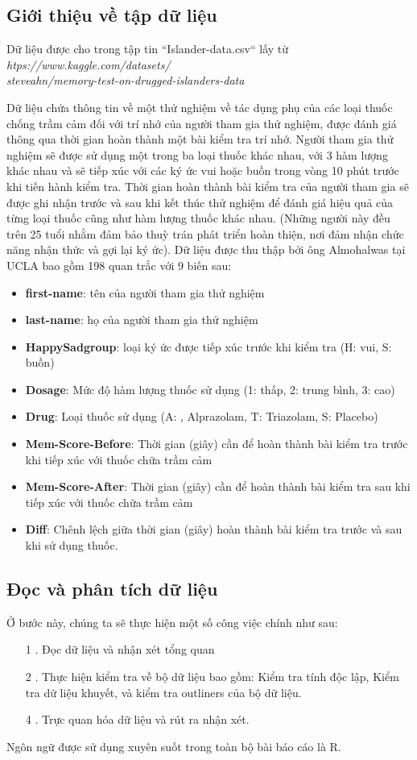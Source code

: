 \subsection{Giới thiệu về tập dữ liệu}
Dữ liệu được cho trong tập tin ``Islander-data.csv`` lấy từ \textit{htps://www.kaggle.com/datasets/\\steveahn/memory-test-on-drugged-islanders-data}

Dữ liệu chứa thông tin về một thử nghiệm về tác dụng phụ của các loại thuốc chống trầm cảm đối với trí nhớ của người tham gia thử nghiệm, được đánh giá thông qua thời gian hoàn thành một bài kiểm tra trí nhớ. Người tham gia thử nghiệm sẽ được sử dụng một trong ba loại thuốc khác nhau, với 3 hàm lượng khác nhau và sẽ tiếp xúc với các ký ức vui hoặc buồn trong vòng 10 phút trước khi tiến hành kiểm tra. Thời gian hoàn thành bài kiểm tra của người tham gia sẽ được ghi nhận trước và sau khi kết thúc thử nghiệm để đánh giá hiệu quả của từng loại thuốc cũng như hàm lượng thuốc khác nhau. (Những người này đều trên 25 tuổi nhằm đảm bảo thuỳ trán phát triển hoàn thiện, nơi đảm nhận chức năng nhận thức và gợi lại ký ức). Dữ liệu được thu thập bởi ông Almohalwas tại UCLA bao gồm 198 quan trắc với 9 biến sau:
\begin{itemize}
    \item \textbf{first-name}: tên của người tham gia thử nghiệm
    \item \textbf{last-name}: họ của người tham gia thử nghiệm
    \item \textbf{HappySadgroup}: loại ký ức được tiếp xúc trước khi kiểm tra (H: vui, S: buồn)
    \item \textbf{Dosage}: Mức độ hàm lượng thuốc sử dụng (1: thấp, 2: trung bình, 3: cao)
    \item \textbf{Drug}: Loại thuốc sử dụng (A: , Alprazolam, T: Triazolam, S: Placebo)
    \item \textbf{Mem-Score-Before}: Thời gian (giây) cần để hoàn thành bài kiểm tra trước khi tiếp xúc với thuốc chữa trầm cảm
    \item \textbf{Mem-Score-After}: Thời gian (giây) cần để hoàn thành bài kiểm tra sau khi tiếp xúc với thuốc chữa trầm cảm
    \item \textbf{Diff}: Chênh lệch giữa thời gian (giây) hoàn thành bài kiểm tra trước và sau khi sử dụng thuốc.
\end{itemize}

\subsection{Đọc và phân tích dữ liệu}
Ở bước này, chúng ta sẽ thực hiện một số công việc chính như sau:
\begin{itemize}
    \item [1]. Đọc dữ liệu và nhận xét tổng quan
    \item [2]. Thực hiện kiểm tra về bộ dữ liệu bao gồm: Kiểm tra tính độc lập, Kiểm tra dữ liệu khuyết, và kiểm tra outliners của bộ dữ liệu.
    \item [4]. Trực quan hóa dữ liệu và rút ra nhận xét.
\end{itemize}
Ngôn ngữ được sử dụng xuyên suốt trong toàn bộ bài báo cáo là R.

